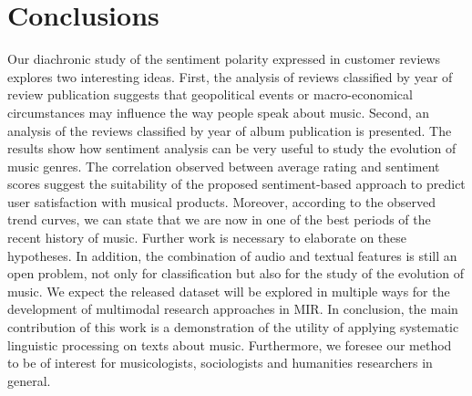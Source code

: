 \section{Conclusions}

Our diachronic study of the sentiment polarity expressed in customer reviews explores two interesting ideas. First, the analysis of reviews classified by year of review publication suggests that geopolitical events or macro-economical circumstances may influence the way people speak about music. Second, an analysis of the reviews classified by year of album publication is presented. The results show how sentiment analysis can be very useful to study the evolution of music genres. The correlation observed between average rating and sentiment scores suggest the suitability of the proposed sentiment-based approach to predict user satisfaction with musical products. Moreover, according to the observed trend curves, we can state that we are now in one of the best periods of the recent history of music.  %
Further work is necessary to elaborate on these hypotheses. In addition, the combination of audio and textual features is still an open problem, not only for classification but also for the study of the evolution of music. We expect the released dataset will be explored in multiple ways for the development of multimodal research approaches in MIR.
In conclusion, the main contribution of this work is a demonstration of the utility of applying systematic linguistic processing on texts about music. Furthermore, we foresee our method to be of interest for musicologists, sociologists and humanities researchers in general.
